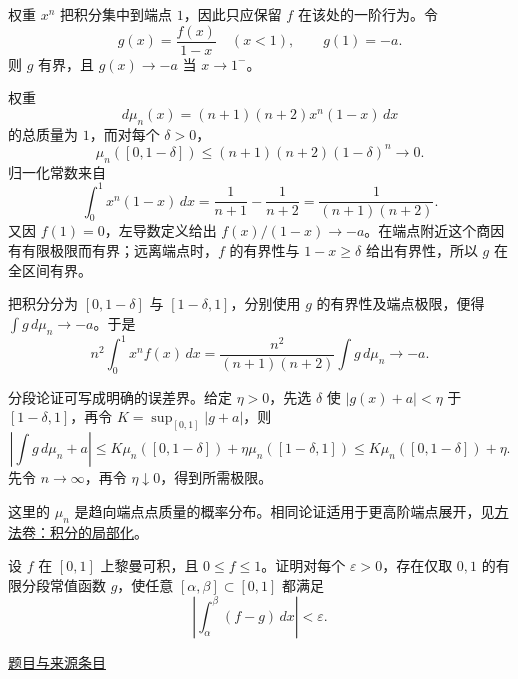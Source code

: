 \documentclass[UTF8,12pt,a4paper,fontset=fandol]{ctexart}
\begin{document}
\begin{solve}\label{ans:pre02-math:4}

权重 $x^n$ 把积分集中到端点 $1$，因此只应保留 $f$ 在该处的一阶行为。令
\[
g(x)=\frac{f(x)}{1-x}\quad(x<1),\qquad g(1)=-a.
\]
则 $g$ 有界，且 $g(x)\to-a$ 当 $x\to1^-$。

权重
\[
d\mu_n(x)=(n+1)(n+2)x^n(1-x)\,dx
\]
的总质量为 $1$，而对每个 $\delta>0$，
\[
\mu_n([0,1-\delta])\le(n+1)(n+2)(1-\delta)^n\longrightarrow0.
\]
归一化常数来自
\[
\int_0^1x^n(1-x)\,dx=\frac1{n+1}-\frac1{n+2}=\frac1{(n+1)(n+2)}.
\]
又因 $f(1)=0$，左导数定义给出 $f(x)/(1-x)\to-a$。在端点附近这个商因有有限极限而有界；远离端点时，$f$ 的有界性与 $1-x\ge\delta$ 给出有界性，所以 $g$ 在全区间有界。

把积分分为 $[0,1-\delta]$ 与 $[1-\delta,1]$，分别使用 $g$ 的有界性及端点极限，便得 $\int g\,d\mu_n\to-a$。于是
\[
n^2\int_0^1x^nf(x)\,dx
=\frac{n^2}{(n+1)(n+2)}\int g\,d\mu_n\longrightarrow-a.
\]

分段论证可写成明确的误差界。给定 $\eta>0$，先选 $\delta$ 使 $|g(x)+a|<\eta$ 于 $[1-\delta,1]$，再令 $K=\sup_{[0,1]}|g+a|$，则
\[
\left|\int g\,d\mu_n+a\right|
\le K\mu_n([0,1-\delta])+\eta\mu_n([1-\delta,1])
\le K\mu_n([0,1-\delta])+\eta.
\]
先令 $n\to\infty$，再令 $\eta\downarrow0$，得到所需极限。

\end{solve}

\begin{remark}[方法与条件]这里的 $\mu_n$ 是趋向端点点质量的概率分布。相同论证适用于更高阶端点展开，见\hyperref[app:integration-local]{方法卷：积分的局部化}。\end{remark}

\begin{example}[来源序号7]\label{ex:pre02-math:7}\label{pr:pre02-math:7}

设 $f$ 在 $[0,1]$ 上黎曼可积，且 $0\le f\le1$。证明对每个 $\varepsilon>0$，存在仅取 $0,1$ 的有限分段常值函数 $g$，使任意 $[\alpha,\beta]\subset[0,1]$ 都满足
\[
\left|\int_\alpha^\beta(f-g)\,dx\right|<\varepsilon.
\]

\par\href{https://github.com/lzxcr/cmc-mathematics/blob/64916fa1fdbc3e444a652eca204d5669058ee321/src/problems/preliminary/02/07.md}{题目与来源条目}

\end{example}
\end{document}
